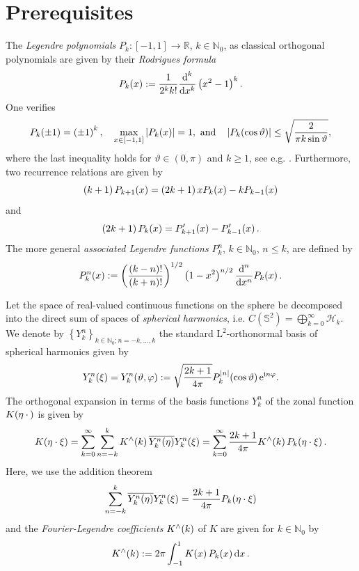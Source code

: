 \documentclass[11pt,a4paper,twoside,bibtotoc]{scrartcl}
\theoremstyle{plain}
\theoremstyle{definition}
\theoremstyle{remark}
\newcommand{\N}{\ensuremath{\mathbb{N}}}
\newcommand{\NZ}{\ensuremath{\mathbb{N}_{0}}}
\newcommand{\R}{\ensuremath{\mathbb{R}}}
\newcommand{\fun}[2]{\ensuremath{#1{\hspace{-0.4ex}}\left(#2\right)}}
\newcommand{\dx}{\text{\rm{d}}}
\newcommand{\e}{\mbox{\rm{e}}}
\newcommand{\im}{\mbox{\scriptsize\rm{i}}}
\numberwithin{equation}{section}
\numberwithin{table}{section}
\numberwithin{figure}{section}
\begin{document}
\section{Prerequisites} \label{sect:2}
The \emph{Legendre polynomials} $P_k : [-1,1] \rightarrow \R$, $k \in
\N_{0}$, as classical orthogonal polynomials are given by their
\emph{Rodrigues formula} 
\[
\fun{P_k}{x} := \frac{1}{2^k k!} \frac{\dx^k}{\dx x^k} \left(x^2-1\right)^k.
\]
One verifies
\begin{equation}\label{leg_prop}
\fun{P_{k}}{\pm1} = \left(\pm1\right)^{k}, \quad
\max_{x \in [-1,1]} \left|\fun{P_{k}}{x}\right| = 1,\text{ and} \quad
\left|\fun{P_{k}}{\cos\vartheta}\right| \le \sqrt{\frac{2}{\pi k
    \sin\vartheta}},
\end{equation}
where the last inequality holds for $\vartheta \in (0,\pi)$ and $k \ge 1$, see
e.g. \cite[pp. 47]{niuv}.
Furthermore, two recurrence relations are given by
\begin{equation}\label{three1}
\left(k+1\right)\fun{P_{k+1}}{x} = \left(2k+1\right)x\fun{P_{k}}{x} - k\fun{P_{k-1}}{x}
\end{equation}
and
\begin{equation}\label{three2}
\left(2k+1\right) \fun{P_{k}}{x} = \fun{P_{k+1}'}{x} - \fun{P_{k-1}'}{x}.
\end{equation}
The more general \emph{associated Legendre functions} $P_{k}^n$, $k \in \NZ$, $n \le k$, are defined by
\[
  \fun{P_{k}^n}{x} := \left(\frac{(k-n)!}{(k+n)!}\right)^{1/2} 
  \left(1-x^2\right)^{n/2} \frac{\dx^n}{\dx x^n} \fun{P_{k}}{x}.
\]

Let the space of real-valued continuous functions on the sphere be decomposed
into the direct sum of spaces of \emph{spherical harmonics}, i.e.
$C(\mathbb{S}^2)=\bigoplus_{k=0}^{\infty} \mathcal{H}_k$. We denote by 
$\left\{Y_{k}^n\right\}_{k \in \NZ; n=-k,\ldots,k}$ the 
standard $\text{L}^2$-orthonormal basis of spherical harmonics given by
\[
  \fun{Y_{k}^n}{\mathbf{\xi}} = \fun{Y_{k}^n}{\vartheta,\varphi} := 
  \sqrt{\frac{2k+1}{4\pi}} 
  \fun{P_{k}^{|n|}}{\cos\vartheta} \e^{\im n \varphi}.
\]
The orthogonal expansion in terms of the basis functions $Y_k^n$ 
of the zonal function $\fun{K}{\mathbf{\eta} \: \cdot \,}$ is given by
\begin{equation}
  \label{equation:kernelExpansion}
  \fun{K}{\mathbf{\eta} \cdot \mathbf{\xi}} = \sum_{k = 0}^{\infty} \sum_{n=-k}^k
  \fun{K^{\wedge}}{k}\overline{\fun{Y_{k}^n}{\mathbf{\eta}}} \fun{Y_{k}^n}{\mathbf{\xi}}
  = \sum_{k = 0}^{\infty} \frac{2k+1}{4\pi} \fun{K^{\wedge}}{k}
  \fun{P_{k}}{\mathbf{\eta} \cdot \mathbf{\xi}}.
\end{equation}
Here, we use the addition theorem
\[
\sum_{n=-k}^{k} \overline{\fun{Y_{k}^n}{\mathbf{\eta}}} \fun{Y_{k}^n}{\mathbf{\xi}} =
    \frac{2k+1}{4\pi}\fun{P_k}{\mathbf{\eta} \cdot \mathbf{\xi}}
\]
and the \emph{Fourier-Legendre coefficients} $\fun{K^{\wedge}}{k}$ of $K$ are given for $k \in \NZ$
by
\begin{equation}
  \label{equation:legtrafo}
  \fun{K^{\wedge}}{k} := 2 \pi \int_{-1}^{1} \fun{K}{x} \fun{P_{k}}{x} \dx 
  x\,.
\end{equation}
\end{document}
